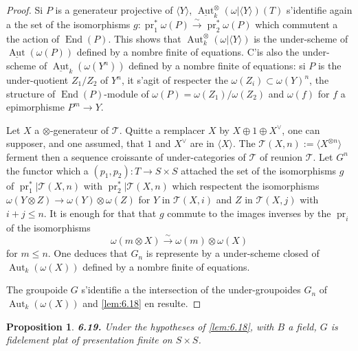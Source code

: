 \documentclass[12pt,a4paper]{article}
\theoremstyle{plain}
\newtheorem{proposition}[theorem]{Proposition}
\theoremstyle{definition}
\theoremstyle{remark}
\DeclareMathOperator{\End}{End}
\DeclareMathOperator{\Aut}{Aut}
\DeclareMathOperator{\pr}{pr}
\begin{document}
\begin{proof}
Si $P$ is a generateur projective of $\langle Y \rangle$, $\underline{\Aut}^\otimes_k(\omega|\langle Y \rangle)(T)$ s'identifie again a the set of the isomorphisms $g : \pr_1^* \omega(P) \xrightarrow{\sim} \pr_2^* \omega(P)$ which commutent a the action of $\End(P)$. This shows that $\Aut^\otimes_k(\omega|\langle Y \rangle)$ is the under-scheme of $\underline{\Aut}(\omega(P))$ defined by a nombre finite of equations. C'is also the under-scheme of $\underline{\Aut}_k(\omega(Y^n))$ defined by a nombre finite of equations: si $P$ is the under-quotient $Z_1/Z_2$ of $Y^n$, it s'agit of respecter the $\omega(Z_i) \subset \omega(Y)^n$, the structure of $\End(P)$-module of $\omega(P) = \omega(Z_1)/\omega(Z_2)$ and $\omega(f)$ for $f$ a epimorphisme $P^m \to Y$.

Let $X$ a $\otimes$-generateur of $\mathcal{T}$. Quitte a remplacer $X$ by $X \oplus 1 \oplus X^\vee$, one can supposer, and one assumed, that $1$ and $X^\vee$ are in $\langle X \rangle$. The $\mathcal{T}(X,n) := \langle X^{\otimes n} \rangle$ ferment then a sequence croissante of under-categories of $\mathcal{T}$ of reunion $\mathcal{T}$. Let $G^n$ the functor which a $(p_1,p_2) : T \to S \times S$ attached the set of the isomorphisms $g$ of $\pr_1^*|\mathcal{T}(X,n)$ with $\pr_2^*|\mathcal{T}(X,n)$ which respectent the isomorphisms $\omega(Y \otimes Z) \to \omega(Y) \otimes \omega(Z)$ for $Y$ in $\mathcal{T}(X,i)$ and $Z$ in $\mathcal{T}(X,j)$ with $i + j \leq n$. It is enough for that that $g$ commute to the images inverses by the $\pr_i$ of the isomorphisms
\[
\omega(m \otimes X) \xrightarrow{\sim} \omega(m) \otimes \omega(X)
\]
for $m \leq n$. One deduces that $G_n$ is represente by a under-scheme closed of $\Aut_k(\omega(X))$ defined by a nombre finite of equations.

The groupoide $G$ s'identifie a the intersection of the under-groupoides $G_n$ of $\Aut_k(\omega(X))$ and \ref{lem:6.18} en resulte.
\end{proof}

\begin{proposition}\label{prop:6.19}
\textbf{6.19.} Under the hypotheses of \ref{lem:6.18}, with $B$ a field, $G$ is fidelement plat of presentation finite on $S \times S$.
\end{proposition}
\end{document}
